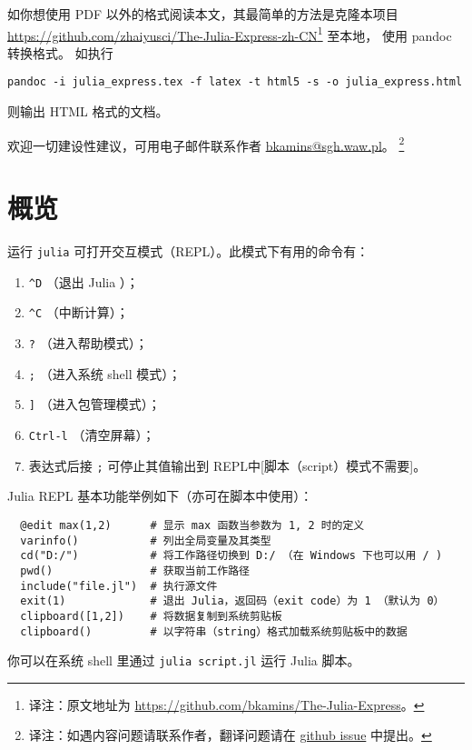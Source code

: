\documentclass[10pt,a4paper]{article}
\begin{document}
如你想使用 PDF 以外的格式阅读本文，其最简单的方法是克隆本项目
\sloppy\url{https://github.com/zhaiyusci/The-Julia-Express-zh-CN}\footnote{译注：原文地址为 \url{https://github.com/bkamins/The-Julia-Express}。}
至本地，
使用 pandoc 转换格式。
如执行
\begin{lstlisting}
pandoc -i julia_express.tex -f latex -t html5 -s -o julia_express.html
\end{lstlisting}
则输出 HTML 格式的文档。

欢迎一切建设性建议，可用电子邮件联系作者 \href{mailto:bkamins@sgh.waw.pl}{bkamins@sgh.waw.pl}。
\footnote{译注：如遇内容问题请联系作者，翻译问题请在 \href{https://github.com/zhaiyusci/The-Julia-Express-zh-CN/issues}{github issue} 中提出。}

\section{概览}

运行 \lstinline|julia| 可打开交互模式（REPL）。此模式下有用的命令有：
\begin{enumerate}[label=\arabic*),nolistsep]
  \item \lstinline|^D| （退出 Julia ）；
  \item \lstinline|^C| （中断计算）；
  \item \lstinline|?| （进入帮助模式）；
  \item \lstinline|;| （进入系统 shell 模式）；
  \item \lstinline|]| （进入包管理模式）；
  \item \lstinline|Ctrl-l| （清空屏幕）；
  \item 表达式后接 \lstinline|;| 可停止其值输出到 REPL中[脚本（script）模式不需要]。
\end{enumerate}

Julia REPL 基本功能举例如下（亦可在脚本中使用）：
\begin{lstlisting}
  @edit max(1,2)      # 显示 max 函数当参数为 1, 2 时的定义
  varinfo()           # 列出全局变量及其类型
  cd("D:/")           # 将工作路径切换到 D:/ （在 Windows 下也可以用 / )
  pwd()               # 获取当前工作路径
  include("file.jl")  # 执行源文件
  exit(1)             # 退出 Julia，返回码（exit code）为 1 （默认为 0）
  clipboard([1,2])    # 将数据复制到系统剪贴板
  clipboard()         # 以字符串（string）格式加载系统剪贴板中的数据
\end{lstlisting}

你可以在系统 shell 里通过 \lstinline|julia script.jl| 运行 Julia 脚本。
\end{document}
